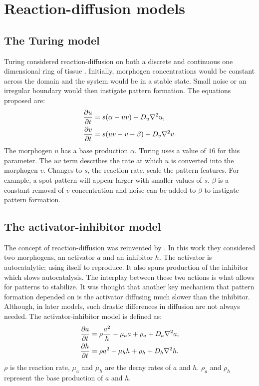 \section{Reaction-diffusion models}
\subsection{The Turing model}
Turing considered reaction-diffusion on both a discrete and continuous one dimensional ring of tissue \citep{Turing1952}. Initially, morphogen concentrations would be constant across the domain and the system would be in a stable state. Small noise or an irregular boundary would then instigate pattern formation. The equations proposed are:
\begin{equation}
\begin{aligned} \label{eq:turingRD}
		\frac{\partial u}{\partial t} &= s(\alpha-uv) + D_u \nabla^2 u,\\
		\frac{\partial v}{\partial t} &= s(uv-v-\beta) + D_v \nabla^2 v.
\end{aligned}
\end{equation}
The morphogen $u$ has a base production $\alpha$. Turing uses a value of $16$ for this parameter. The $uv$ term describes the rate at which $u$ is converted into the morphogen $v$. Changes to $s$, the reaction rate, scale the pattern features. For example, a spot pattern will appear larger with smaller values of $s$. $\beta$ is a constant removal of $v$ concentration and noise can be added to $\beta$ to instigate pattern formation.

\subsection{The activator-inhibitor model}
The concept of reaction-diffusion was reinvented by \citet{Gierer1972}. In this work they considered two morphogens, an activator $a$ and an inhibitor $h$. The activator is autocatalytic; using itself to reproduce. It also spurs production of the inhibitor which slows autocatalysis. The interplay between these two actions is what allows for patterns to stabilize. It was thought that another key mechanism that pattern formation depended on is the activator diffusing much slower than the inhibitor. Although, in later models, such drastic differences in diffusion are not always needed. The activator-inhibitor model is defined as:
\begin{equation}
\begin{aligned} \label{eq:activatorInhibitorRD}
		\frac{\partial a}{\partial t} &= \rho \frac{a^2}{h} - \mu_a a + \rho_a + D_a \nabla^2 a,\\
		\frac{\partial h}{\partial t} &= \rho a^2 - \mu_h h  + \rho_h + D_h \nabla^2 h.
\end{aligned}
\end{equation}
$\rho$ is the reaction rate, $\mu_a$ and $\mu_h$ are the decay rates of $a$ and $h$. $\rho_a$ and $\rho_h$ represent the base production of $a$ and $h$. 

